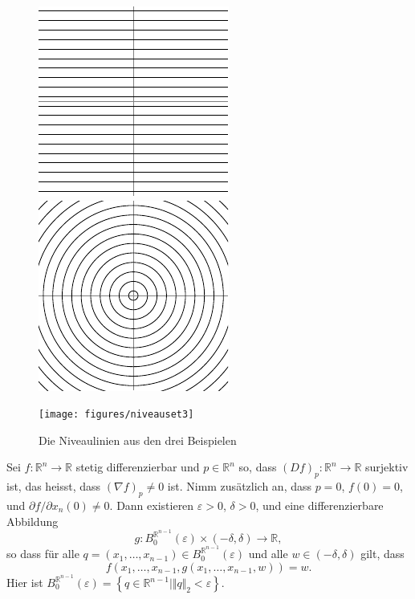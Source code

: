 \documentclass[../main.tex]{subfiles}
\begin{document}
\begin{figure}[htb]
  \centering
  \begin{minipage}{0.33\textwidth}
    \centering
    \includegraphics{figures/niveauset1}
  \end{minipage}%
  \begin{minipage}{0.33\textwidth}
    \centering
    \includegraphics{figures/niveauset2}
  \end{minipage}%
  \begin{minipage}{0.33\textwidth}
    \centering
    \texttt{[image: figures/niveauset3]}
  \end{minipage}%
  \caption{Die Niveaulinien aus den drei Beispielen}%
  \label{fig:niveausets}
\end{figure}

\begin{theorem}%
  \label{thm:implicit-special}
  Sei $f \colon \mathbb{R}^n \to \mathbb{R}$
  stetig differenzierbar und $p \in \mathbb{R}^n$
  so, dass ${(Df)}_p \colon \mathbb{R}^n \to \mathbb{R}$ surjektiv ist,
  das heisst, dass ${(\nabla f)}_p \neq 0$ ist.
  Nimm zusätzlich an, dass $p = 0$, $f(0) = 0$,
  und $\partial f/ \partial x_n (0) \neq 0$.
  Dann existieren $\varepsilon > 0$, $\delta > 0$,
  und eine differenzierbare Abbildung
  \[
  g \colon B_0^{\mathbb{R}^{n-1}}(\varepsilon) \times (-\delta, \delta)
  \to \mathbb{R},
  \]
  so dass für alle
  $q = (x_1, \dots, x_{n-1}) \in B_0^{\mathbb{R}^{n-1}}(\varepsilon)$
  und alle $w \in (-\delta, \delta)$ gilt, dass
  \[
  f(x_1, \dots, x_{n-1}, g(x_1, \dots, x_{n-1}, w)) = w.
  \]
  Hier ist $B_0^{\mathbb{R}^{n-1}}(\varepsilon)
  = \left\{q \in\mathbb{R}^{n-1} \mid \Vert q \Vert_2 < \varepsilon \right\}$.
\end{theorem}
\end{document}
